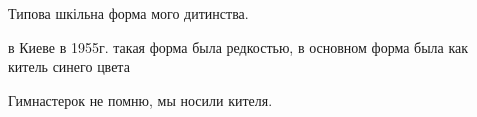  
 
 
 
 

Типова шкільна форма мого дитинства.

в Киеве в 1955г. такая форма была редкостью, в основном форма была как китель синего цвета

Гимнастерок не помню, мы носили кителя.
